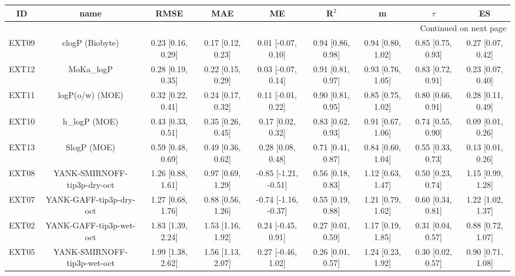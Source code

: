 \documentclass{article}
\begin{document}
\begin{center}
\scriptsize
\begin{longtable}{|ccccccccc|}
\toprule
    ID &                            name &               RMSE &                MAE &                    ME &              R$^2$ &                   m &              $\tau$ &                 ES \\
\midrule
\endhead
\midrule
\multicolumn{9}{r}{{Continued on next page}} \\
\midrule
\endfoot

\bottomrule
\endlastfoot
 EXT09 &                 clogP (Biobyte) &  0.23 [0.16, 0.29] &  0.17 [0.12, 0.23] &    0.01 [-0.07, 0.10] &  0.94 [0.86, 0.98] &   0.94 [0.80, 1.02] &   0.85 [0.75, 0.93] &  0.27 [0.07, 0.42] \\
 EXT12 &                      MoKa\_logP &  0.28 [0.19, 0.35] &  0.22 [0.15, 0.29] &    0.03 [-0.07, 0.14] &  0.91 [0.81, 0.97] &   0.93 [0.76, 1.05] &   0.83 [0.72, 0.91] &  0.23 [0.07, 0.40] \\
 EXT11 &                 logP(o/w) (MOE) &  0.32 [0.22, 0.41] &  0.24 [0.17, 0.32] &    0.11 [-0.01, 0.22] &  0.90 [0.81, 0.95] &   0.85 [0.75, 1.02] &   0.80 [0.66, 0.91] &  0.28 [0.11, 0.49] \\
 EXT10 &                   h\_logP (MOE) &  0.43 [0.33, 0.51] &  0.35 [0.26, 0.45] &     0.17 [0.02, 0.32] &  0.83 [0.62, 0.93] &   0.91 [0.67, 1.06] &   0.74 [0.55, 0.90] &  0.09 [0.01, 0.26] \\
 EXT13 &                     SlogP (MOE) &  0.59 [0.48, 0.69] &  0.49 [0.36, 0.62] &     0.28 [0.08, 0.48] &  0.71 [0.41, 0.87] &   0.84 [0.60, 1.04] &   0.55 [0.33, 0.73] &  0.13 [0.01, 0.26] \\
 EXT08 &     YANK-SMIRNOFF-tip3p-dry-oct &  1.26 [0.88, 1.61] &  0.97 [0.69, 1.29] &  -0.85 [-1.21, -0.51] &  0.56 [0.18, 0.83] &   1.12 [0.63, 1.47] &   0.50 [0.23, 0.74] &  1.15 [0.99, 1.28] \\
 EXT07 &         YANK-GAFF-tip3p-dry-oct &  1.27 [0.68, 1.76] &  0.88 [0.56, 1.26] &  -0.74 [-1.16, -0.37] &  0.55 [0.19, 0.88] &   1.21 [0.79, 1.62] &   0.60 [0.34, 0.81] &  1.22 [1.02, 1.37] \\
 EXT02 &         YANK-GAFF-tip3p-wet-oct &  1.83 [1.39, 2.24] &  1.53 [1.16, 1.92] &    0.24 [-0.45, 0.91] &  0.27 [0.01, 0.59] &   1.17 [0.19, 1.85] &   0.31 [0.04, 0.57] &  0.88 [0.72, 1.07] \\
 EXT05 &     YANK-SMIRNOFF-tip3p-wet-oct &  1.99 [1.38, 2.62] &  1.56 [1.13, 2.07] &    0.27 [-0.46, 1.02] &  0.26 [0.01, 0.57] &   1.24 [0.23, 1.92] &   0.30 [0.02, 0.57] &  0.90 [0.71, 1.08] \\

\end{longtable}
\end{center}
\end{document}
